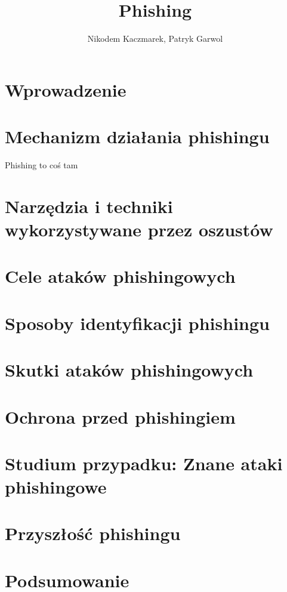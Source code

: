 \documentclass[]{article}
\title{Phishing}
\author{Nikodem Kaczmarek, Patryk Garwol}
\begin{document}
\maketitle

\newpage 
\section{Wprowadzenie}

\newpage
\section{Mechanizm działania phishingu}
Phishing to coś tam \cite{whatIsPhishingCNBC}
\newpage
\section{Narzędzia i techniki wykorzystywane przez oszustów}

\newpage
\section{Cele ataków phishingowych}

\newpage
\section{Sposoby identyfikacji phishingu}

\newpage
\section{Skutki ataków phishingowych}

\newpage
\section{Ochrona przed phishingiem}

\newpage
\section{Studium przypadku: Znane ataki phishingowe}

\newpage
\section{Przyszłość phishingu}

\newpage
\section{Podsumowanie}

\newpage


\end{document}
